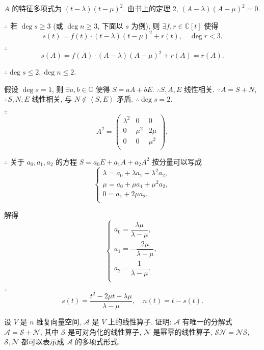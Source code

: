 \documentclass[color=black,device=normal,lang=cn,mode=geye]{elegantnote}
\begin{document}
\begin{solution}
    $A$ 的特征多项式为 $(t-\lambda)(t-\mu)^2$. 由书上的定理 2, $(A-\lambda)(A-\mu)^2=0$.

    $\therefore$ 若 $\deg s\geq3$ (或 $\deg n\geq3$, 下面以 $s$ 为例), 则 $\exists f,r\in\mathbb{C}[t]$ 使得
    \[s(t)=f(t)\cdot(t-\lambda)(t-\mu)^2+r(t),\quad\deg r<3.\]

    $\therefore$
    \[s(A)=f(A)\cdot(A-\lambda)(A-\mu)^2+r(A)=r(A).\]

    $\therefore\deg s\leq 2,\deg n\leq 2$.

    假设 $\deg s=1$, 则 $\exists a,b\in\mathbb{C}$ 使得 $S=aA+bE$. $\therefore S,A,E$ 线性相关. $\because A=S+N$, $\therefore S,N,E$ 线性相关, 与 $N\notin\left<S,E\right>$ 矛盾. $\therefore\deg s=2$.

    $\because$
    \[A^2=\begin{pmatrix}
        \lambda^2 & 0 & 0 \\
        0 & \mu^2 & 2\mu \\
        0 & 0 & \mu^2 \\
    \end{pmatrix},\]

    $\therefore$ 关于 $a_0,a_1,a_2$ 的方程 $S=a_0E+a_1A+a_2A^2$ 按分量可以写成
    \[\begin{cases}
        \lambda=a_0+\lambda a_1+\lambda^2a_2, \\
        \mu=a_0+\mu a_1+\mu^2a_2, \\
        0=a_1+2\mu a_2. \\
    \end{cases}\]

    解得
    \[\begin{cases}
        a_0=\dfrac{\lambda\mu}{\lambda-\mu}, \\[8pt]
        a_1=-\dfrac{2\mu}{\lambda-\mu}, \\[8pt]
        a_2=\dfrac{1}{\lambda-\mu}. \\
    \end{cases}\]

    $\therefore$
    \[s(t)=\dfrac{t^2-2\mu t+\lambda\mu}{\lambda-\mu},\quad n(t)=t-s(t).\]
\end{solution}
\begin{exercise}%
    设 $V$ 是 $n$ 维复向量空间, $\mathcal{A}$ 是 $V$ 上的线性算子. 证明: $\mathcal{A}$ 有唯一的分解式 $\mathcal{A}=\mathcal{S}+\mathcal{N}$, 其中 $\mathcal{S}$ 是可对角化的线性算子, $\mathcal{N}$ 是幂零的线性算子, $\mathcal{SN}=\mathcal{NS}$, $\mathcal{S},\mathcal{N}$ 都可以表示成 $\mathcal{A}$ 的多项式形式.
\end{exercise}
\end{document}
